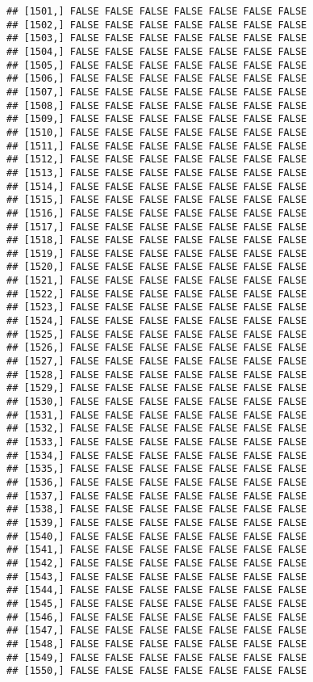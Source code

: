 \documentclass[
]{article}
\begin{document}
\begin{verbatim}
## [1501,] FALSE FALSE FALSE FALSE FALSE FALSE FALSE
## [1502,] FALSE FALSE FALSE FALSE FALSE FALSE FALSE
## [1503,] FALSE FALSE FALSE FALSE FALSE FALSE FALSE
## [1504,] FALSE FALSE FALSE FALSE FALSE FALSE FALSE
## [1505,] FALSE FALSE FALSE FALSE FALSE FALSE FALSE
## [1506,] FALSE FALSE FALSE FALSE FALSE FALSE FALSE
## [1507,] FALSE FALSE FALSE FALSE FALSE FALSE FALSE
## [1508,] FALSE FALSE FALSE FALSE FALSE FALSE FALSE
## [1509,] FALSE FALSE FALSE FALSE FALSE FALSE FALSE
## [1510,] FALSE FALSE FALSE FALSE FALSE FALSE FALSE
## [1511,] FALSE FALSE FALSE FALSE FALSE FALSE FALSE
## [1512,] FALSE FALSE FALSE FALSE FALSE FALSE FALSE
## [1513,] FALSE FALSE FALSE FALSE FALSE FALSE FALSE
## [1514,] FALSE FALSE FALSE FALSE FALSE FALSE FALSE
## [1515,] FALSE FALSE FALSE FALSE FALSE FALSE FALSE
## [1516,] FALSE FALSE FALSE FALSE FALSE FALSE FALSE
## [1517,] FALSE FALSE FALSE FALSE FALSE FALSE FALSE
## [1518,] FALSE FALSE FALSE FALSE FALSE FALSE FALSE
## [1519,] FALSE FALSE FALSE FALSE FALSE FALSE FALSE
## [1520,] FALSE FALSE FALSE FALSE FALSE FALSE FALSE
## [1521,] FALSE FALSE FALSE FALSE FALSE FALSE FALSE
## [1522,] FALSE FALSE FALSE FALSE FALSE FALSE FALSE
## [1523,] FALSE FALSE FALSE FALSE FALSE FALSE FALSE
## [1524,] FALSE FALSE FALSE FALSE FALSE FALSE FALSE
## [1525,] FALSE FALSE FALSE FALSE FALSE FALSE FALSE
## [1526,] FALSE FALSE FALSE FALSE FALSE FALSE FALSE
## [1527,] FALSE FALSE FALSE FALSE FALSE FALSE FALSE
## [1528,] FALSE FALSE FALSE FALSE FALSE FALSE FALSE
## [1529,] FALSE FALSE FALSE FALSE FALSE FALSE FALSE
## [1530,] FALSE FALSE FALSE FALSE FALSE FALSE FALSE
## [1531,] FALSE FALSE FALSE FALSE FALSE FALSE FALSE
## [1532,] FALSE FALSE FALSE FALSE FALSE FALSE FALSE
## [1533,] FALSE FALSE FALSE FALSE FALSE FALSE FALSE
## [1534,] FALSE FALSE FALSE FALSE FALSE FALSE FALSE
## [1535,] FALSE FALSE FALSE FALSE FALSE FALSE FALSE
## [1536,] FALSE FALSE FALSE FALSE FALSE FALSE FALSE
## [1537,] FALSE FALSE FALSE FALSE FALSE FALSE FALSE
## [1538,] FALSE FALSE FALSE FALSE FALSE FALSE FALSE
## [1539,] FALSE FALSE FALSE FALSE FALSE FALSE FALSE
## [1540,] FALSE FALSE FALSE FALSE FALSE FALSE FALSE
## [1541,] FALSE FALSE FALSE FALSE FALSE FALSE FALSE
## [1542,] FALSE FALSE FALSE FALSE FALSE FALSE FALSE
## [1543,] FALSE FALSE FALSE FALSE FALSE FALSE FALSE
## [1544,] FALSE FALSE FALSE FALSE FALSE FALSE FALSE
## [1545,] FALSE FALSE FALSE FALSE FALSE FALSE FALSE
## [1546,] FALSE FALSE FALSE FALSE FALSE FALSE FALSE
## [1547,] FALSE FALSE FALSE FALSE FALSE FALSE FALSE
## [1548,] FALSE FALSE FALSE FALSE FALSE FALSE FALSE
## [1549,] FALSE FALSE FALSE FALSE FALSE FALSE FALSE
## [1550,] FALSE FALSE FALSE FALSE FALSE FALSE FALSE

\end{verbatim}
\end{document}
